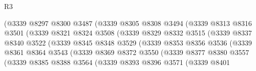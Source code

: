 \begin{lexlean}{R3}
\begin{coremodule}
                            (@3339
                              @8297
                              @8300
                              @3487
                              (@3339
                                @8305
                                @8308
                                @3494
                                (@3339
                                  @8313
                                  @8316
                                  @3501
                                  (@3339
                                    @8321
                                    @8324
                                    @3508
                                    (@3339
                                      @8329
                                      @8332
                                      @3515
                                      (@3339
                                        @8337
                                        @8340
                                        @3522
                                        (@3339
                                          @8345
                                          @8348
                                          @3529
                                          (@3339
                                            @8353
                                            @8356
                                            @3536
                                            (@3339
                                              @8361
                                              @8364
                                              @3543
                                              (@3339
                                                @8369
                                                @8372
                                                @3550
                                                (@3339
                                                  @8377
                                                  @8380
                                                  @3557
                                                  (@3339
                                                    @8385
                                                    @8388
                                                    @3564
                                                    (@3339
                                                      @8393
                                                      @8396
                                                      @3571
                                                      (@3339
                                                        @8401

\end{coremodule}
\end{lexlean}
